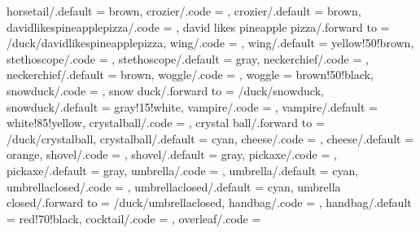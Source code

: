 {  horsetail/.default        = brown,
  crozier/.code             = \duck@croziertrue     
                              \def\duck@crozier{#1},
  crozier/.default          = brown,
  davidlikespineapplepizza/.code = \duck@davidlikespineapplepizzatrue
                              \duck@speechtrue 
  \def\duck@speech{\scalebox{\scalingfactor}{\scalebox{0.9}{\tiny ih, che schifo!}}},
  david likes pineapple pizza/.forward to = /duck/davidlikespineapplepizza,
  wing/.code                = \duck@wingtrue      
                              \def\duck@wing{#1},
  wing/.default             = yellow!50!brown,
  stethoscope/.code         = \duck@stethoscopetrue 
                              \def\duck@stethoscope{#1},
  stethoscope/.default      = gray,
  neckerchief/.code         = \duck@neckerchieftrue 
                              \def\duck@neckerchief{#1},
  neckerchief/.default      = brown,
  woggle/.code              = \def\duck@woggle{#1},
  woggle                    = brown!50!black,
  snowduck/.code            = \duck@snowducktrue 
                              \def\duck@snowduck{#1}
                              \def\duck@eye{#1}
                              \def\duck@body{#1}
                              \duck@tophattrue
                              \def\duck@tophat{black}
                              \duck@buttonstrue  
                              \def\duck@buttons{black},
  snow duck/.forward to     = /duck/snowduck,
  snowduck/.default         = gray!15!white,
  vampire/.code             = \duck@vampiretrue  
                              \def\duck@vampire{#1},
  vampire/.default          = white!85!yellow,
  crystalball/.code         = \duck@crystalballtrue 
                              \def\duck@crystalball{#1},
  crystal ball/.forward to  = /duck/crystalball,
  crystalball/.default      = cyan,
  cheese/.code              = \duck@cheesetrue
                              \def\duck@cheese{#1},
  cheese/.default           = orange,  
  shovel/.code              = \duck@shoveltrue
                              \def\duck@shovel{#1},
  shovel/.default           = gray,    
  pickaxe/.code             = \duck@pickaxetrue
                              \def\duck@pickaxe{#1},
  pickaxe/.default          = gray,  
  umbrella/.code            = \duck@umbrellatrue
                              \def\duck@umbrella{#1},
  umbrella/.default         = cyan,      
  umbrellaclosed/.code      = \duck@umbrellaclosedtrue
                              \def\duck@umbrellaclosed{#1},
  umbrellaclosed/.default   = cyan,    
  umbrella closed/.forward to  = /duck/umbrellaclosed,
  handbag/.code             = \duck@handbagtrue
                              \def\duck@handbag{#1},
  handbag/.default          = red!70!black,  
  cocktail/.code             = \duck@cocktailtrue,
  overleaf/.code            = \duck@overleaftrue 
                              \def\duck@body{duck@overleafcol}
                              \duck@graduatetrue
                              \def\duck@graduate{black}
                              \duck@squareglassestrue
                              \def\duck@squareglasses{black}
}

